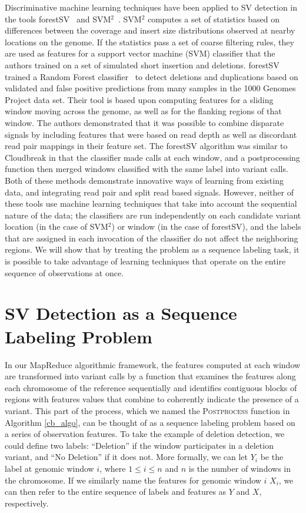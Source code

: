 Discriminative machine learning techniques have been applied to SV detection in the tools forestSV~\cite{Michaelson:2012fj} and SVM$^2$~\cite{Chiara:2012ey}. SVM$^2$ computes a set of statistics based on differences between the coverage and insert size distributions observed at nearby locations on the genome. If the statistics pass a set of coarse filtering rules, they are used as features for a support vector machine (SVM) classifier that the authors trained on a set of simulated short insertion and deletions. forestSV trained a Random Forest classifier~\cite{breiman2001} to detect deletions and duplications based on validated and false positive predictions from many samples in the 1000 Genomes Project data set. Their tool is based upon computing features for a sliding window moving across the genome, as well as for the flanking regions of that window. The authors demonstrated that it was possible to combine disparate signals by including features that were based on read depth as well as discordant read pair mappings in their feature set. The forestSV algorithm was similar to Cloudbreak in that the classifier made calls at each window, and a postprocessing function then merged windows classified with the same label into variant calls. Both of these methods demonstrate innovative ways of learning from existing data, and integrating read pair and split read based signals. However, neither of these tools use machine learning techniques that take into account the sequential nature of the data; the classifiers are run independently on each candidate variant location (in the case of SVM$^2$) or window (in the case of forestSV), and the labels that are assigned in each invocation of the classifier do not affect the neighboring regions. We will show that by treating the problem as a sequence labeling task, it is possible to take advantage of learning techniques that operate on the entire sequence of observations at once.

\section{SV Detection as a Sequence Labeling Problem}

In our MapReduce algorithmic framework, the features computed at each window are transformed into variant calls by a function that examines the features along each chromosome of the reference sequentially and identifies contiguous blocks of regions with features values that combine to coherently indicate the presence of a variant. This part of the process, which we named the \textsc{Postprocess} function in Algorithm \ref{cb_algo}, can be thought of as a sequence labeling problem based on a series of observation features. To take the example of deletion detection, we could define two labels: ``Deletion'' if the window participates in a deletion variant, and ``No Deletion'' if it does not. More formally, we can let $Y_i$ be the label at genomic window $i$, where $1 \le i \le n$ and $n$ is the number of windows in the chromosome. If we similarly name the features for genomic window $i$ $X_i$, we can then refer to the entire sequence of labels and features as $Y$ and $X$, respectively.

